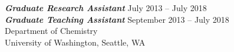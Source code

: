 \documentclass[10pt]{res} %
\begin{document}
\begin{resume}
{\sl \bf Graduate Research Assistant} \dotfill July 2013 -- July 2018 \\
{\sl \bf Graduate Teaching Assistant} \dotfill September 2013 -- July 2018 \\
Department of Chemistry \\
University of Washington, Seattle, WA 




\end{resume}
\end{document}
